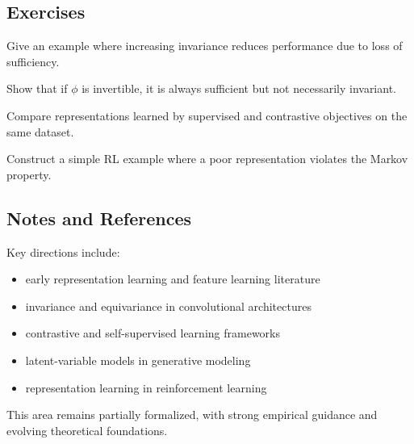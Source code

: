 \subsection{Exercises}

\begin{exercise}
Give an example where increasing invariance reduces performance due to loss of sufficiency.
\end{exercise}

\begin{exercise}
Show that if $\phi$ is invertible, it is always sufficient but not necessarily invariant.
\end{exercise}

\begin{exercise}
Compare representations learned by supervised and contrastive objectives on the same dataset.
\end{exercise}

\begin{exercise}
Construct a simple RL example where a poor representation violates the Markov property.
\end{exercise}

\subsection{Notes and References}

Key directions include:
\begin{itemize}
\item early representation learning and feature learning literature
\item invariance and equivariance in convolutional architectures
\item contrastive and self-supervised learning frameworks
\item latent-variable models in generative modeling
\item representation learning in reinforcement learning
\end{itemize}

This area remains partially formalized, with strong empirical guidance and evolving theoretical foundations.